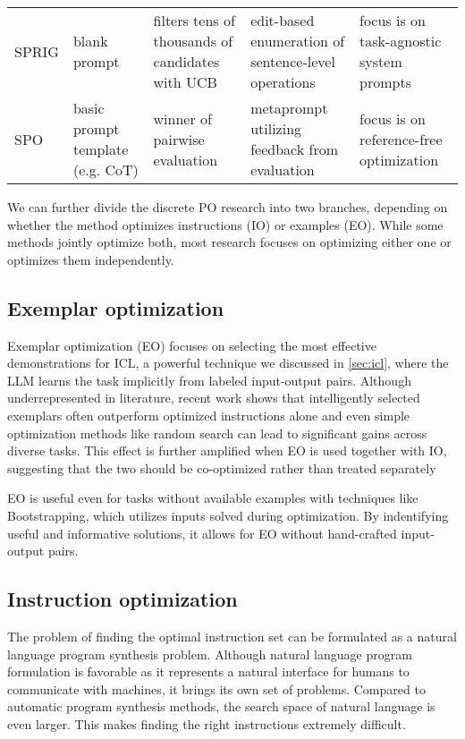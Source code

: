 \begin{landscape}
\begin{table}[htbp]
\begin{tabularx}{\linewidth}{@{}l Y Y Y Y@{}}
SPRIG\cite{zhang2024sprigimprovinglargelanguage} & blank prompt & filters tens of thousands of candidates with UCB & edit-based enumeration of sentence-level operations & focus is on task-agnostic system prompts \\
SPO\cite{xiang2025selfsupervisedpromptoptimization} & basic prompt template (e.g. CoT) & winner of pairwise evaluation & metaprompt utilizing feedback from evaluation & focus is on reference-free optimization\\
\bottomrule
\end{tabularx}
\end{table}
\end{landscape}

We can further divide the discrete PO research into two branches, depending on whether 
the method optimizes instructions (IO) or examples (EO). While some methods jointly optimize both, most
research focuses on optimizing either one or optimizes them independently. 

\subsection{Exemplar optimization}

Exemplar optimization (EO) focuses on selecting the most effective demonstrations for ICL, a powerful technique we discussed in \ref{sec:icl},
where the LLM learns the task implicitly from labeled input-output pairs. Although underrepresented in literature\cite{wan2024teachbettersmarterinstructions},
recent work\cite{opsahlong2024optimizinginstructionsdemonstrationsmultistage}\cite{wan2024teachbettersmarterinstructions} shows that intelligently selected
exemplars often outperform optimized instructions alone and even simple optimization methods like random search can lead to significant gains across diverse tasks.
This effect is further amplified when EO is used together with IO, suggesting that the two should be co-optimized rather than treated separately\cite{wan2024teachbettersmarterinstructions}

EO is useful even for tasks without available examples with techniques like Bootstrapping\cite{khattab2023dspycompilingdeclarativelanguage},
which utilizes inputs solved during optimization. By indentifying useful and informative solutions, it allows for EO without hand-crafted input-output pairs.


\subsection{Instruction optimization}
The problem of finding the optimal instruction set can be formulated as a natural language program synthesis problem\cite{zhou2023largelanguagemodelshumanlevel}.
Although natural language program formulation is favorable as it represents a 
natural interface for humans to communicate with machines, it brings its own set of problems.
Compared to automatic program synthesis methods, the search space of natural language is even larger. 
This makes finding the right instructions extremely difficult. 

